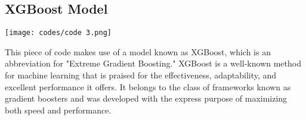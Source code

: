 \documentclass[12pt]{article}
\begin{document}
\subsection{XGBoost Model}
\begin{center}
    \texttt{[image: codes/code 3.png]}
\end{center}
This piece of code makes use of a model known as XGBoost, which is an abbreviation for "Extreme Gradient Boosting." XGBoost is a well-known method for machine learning that is praised for the effectiveness, adaptability, and excellent performance it offers. It belongs to the class of frameworks known as gradient boosters and was developed with the express purpose of maximizing both speed and performance. \cite{xgboost}
\end{document}
